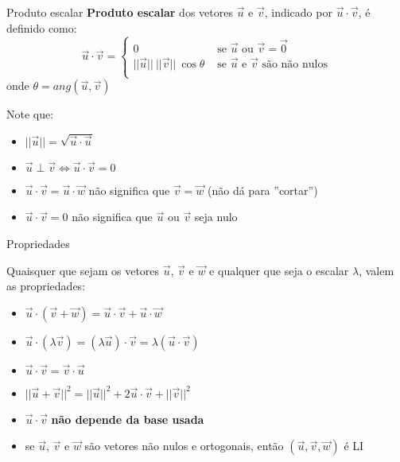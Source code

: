 \begin{frame}{Produto escalar}
    \textbf{Produto escalar} dos vetores \(\vec{u}\) e \(\vec{v}\), indicado por \(\vec{u}\cdot\vec{v}\), é definido como:
    \[
        \vec{u}\cdot\vec{v}=
        \begin{cases}
            0 &\text{ se } \vec{u} \text{ ou } \vec{v} = \vec{0} \\
            ||\vec{u}||~||\vec{v}|| ~\cos{\theta} & \text{ se } \vec{u} \text{ e } \vec{v} \text{ são não nulos}\\
        \end{cases}
    \]
    onde \(\theta = ang(\vec{u},\vec{v})\)

    Note que:
    \begin{itemize}
        \item \(||\vec{u}|| = \sqrt{\vec{u}\cdot\vec{u}}\)
        \item \(\vec{u} \perp \vec{v} \Leftrightarrow \vec{u}\cdot\vec{v}=0\)
        \item \(\vec{u}\cdot\vec{v} = \vec{u}\cdot\vec{w}\) não significa que \(\vec{v}=\vec{w}\) (não dá para ''cortar'')
        \item \(\vec{u}\cdot\vec{v}=0\) não significa que \(\vec{u}\) ou \(\vec{v}\) seja nulo
    \end{itemize}
\end{frame}

\begin{frame}{Propriedades}

    Quaisquer que sejam os vetores \(\vec{u}\), \(\vec{v}\) e \(\vec{w}\) e qualquer que seja o escalar \(\lambda\), valem as propriedades:
    \begin{itemize}
        \item \(\vec{u}\cdot (\vec{v}+\vec{w})=\vec{u}\cdot\vec{v}+\vec{u}\cdot\vec{w}\)
        \item \(\vec{u}\cdot (\lambda\vec{v})=(\lambda\vec{u})\cdot\vec{v}=\lambda (\vec{u}\cdot\vec{v})\)
        \item \(\vec{u}\cdot\vec{v}=\vec{v}\cdot\vec{u}\)
        \item \(||\vec{u}+\vec{v}||^2=||\vec{u}||^2+2\vec{u}\cdot\vec{v}+||\vec{v}||^2\)
        \item \(\vec{u}\cdot\vec{v}\) \textbf{não depende da base usada}
        \item se \(\vec{u}\), \(\vec{v}\) e \(\vec{w}\) são vetores não nulos e ortogonais, então \((\vec{u},\vec{v},\vec{w})\) é LI

    \end{itemize}

\end{frame}

